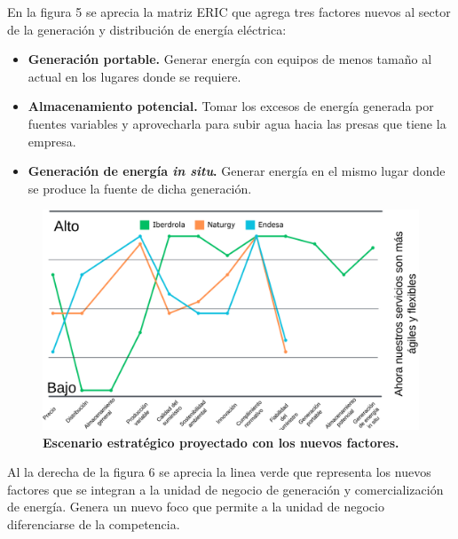 \documentclass{article}
\begin{document}
En la figura 5 se aprecia la matriz ERIC que agrega tres factores nuevos al sector de la generación y distribución de energía eléctrica: 
\begin{itemize}
    \item \textbf{Generación portable.} Generar energía con equipos de menos tamaño al actual en los lugares donde se requiere. 
    \item \textbf{Almacenamiento potencial.} Tomar los excesos de energía generada por fuentes variables y aprovecharla para subir agua hacia las presas que tiene la empresa. 
    \item \textbf{Generación de energía \textit{in situ}.} Generar energía en el mismo lugar donde se produce la fuente de dicha generación. 
\end{itemize}

\begin{figure}[h!]
    \centering
    \includegraphics[width=0.8\linewidth]{Estrategico futuro.png}
    \caption{\textbf{Escenario estratégico proyectado con los nuevos factores.}}
    \label{fig:enter-label}
\end{figure}

Al la derecha de la figura 6 se aprecia la linea verde que representa los nuevos factores que se integran a la unidad de negocio de generación y comercialización de energía. Genera un nuevo foco que permite a la unidad de negocio diferenciarse de la competencia.  
\end{document}
